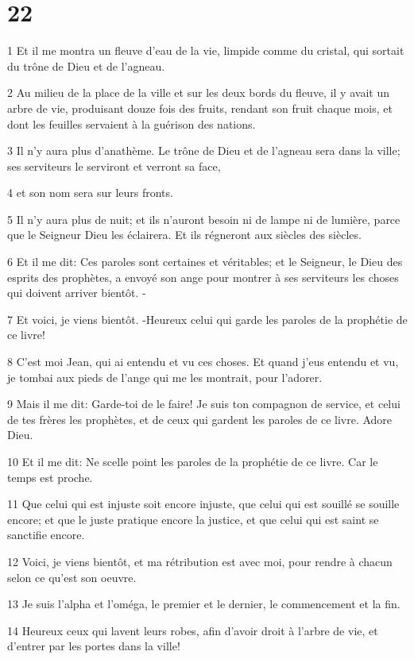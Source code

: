 \chapter{22}

\par 1 Et il me montra un fleuve d'eau de la vie, limpide comme du cristal, qui sortait du trône de Dieu et de l'agneau.
\par 2 Au milieu de la place de la ville et sur les deux bords du fleuve, il y avait un arbre de vie, produisant douze fois des fruits, rendant son fruit chaque mois, et dont les feuilles servaient à la guérison des nations.
\par 3 Il n'y aura plus d'anathème. Le trône de Dieu et de l'agneau sera dans la ville; ses serviteurs le serviront et verront sa face,
\par 4 et son nom sera sur leurs fronts.
\par 5 Il n'y aura plus de nuit; et ils n'auront besoin ni de lampe ni de lumière, parce que le Seigneur Dieu les éclairera. Et ils régneront aux siècles des siècles.
\par 6 Et il me dit: Ces paroles sont certaines et véritables; et le Seigneur, le Dieu des esprits des prophètes, a envoyé son ange pour montrer à ses serviteurs les choses qui doivent arriver bientôt. -
\par 7 Et voici, je viens bientôt. -Heureux celui qui garde les paroles de la prophétie de ce livre!
\par 8 C'est moi Jean, qui ai entendu et vu ces choses. Et quand j'eus entendu et vu, je tombai aux pieds de l'ange qui me les montrait, pour l'adorer.
\par 9 Mais il me dit: Garde-toi de le faire! Je suis ton compagnon de service, et celui de tes frères les prophètes, et de ceux qui gardent les paroles de ce livre. Adore Dieu.
\par 10 Et il me dit: Ne scelle point les paroles de la prophétie de ce livre. Car le temps est proche.
\par 11 Que celui qui est injuste soit encore injuste, que celui qui est souillé se souille encore; et que le juste pratique encore la justice, et que celui qui est saint se sanctifie encore.
\par 12 Voici, je viens bientôt, et ma rétribution est avec moi, pour rendre à chacun selon ce qu'est son oeuvre.
\par 13 Je suis l'alpha et l'oméga, le premier et le dernier, le commencement et la fin.
\par 14 Heureux ceux qui lavent leurs robes, afin d'avoir droit à l'arbre de vie, et d'entrer par les portes dans la ville!
